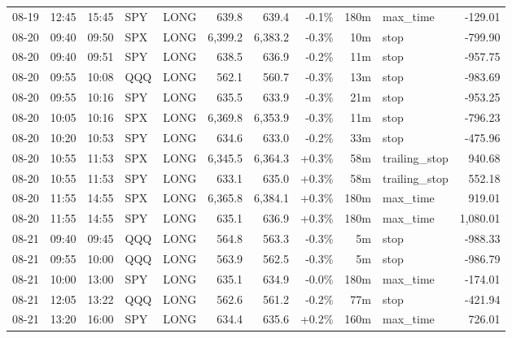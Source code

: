 \documentclass[11pt,a4paper,twoside]{article}
\begin{document}
\begin{center}
\begin{longtable}{>{\color{txtmain}}l l l l l r r r r >{\color{txtmain}}l r}
08-19 & 12:45 & 15:45 & SPY & LONG & 639.8 & 639.4 & \textcolor{lossred}{-0.1\%} & 180m & max\_time & \textcolor{lossred}{-129.01} \\
08-20 & 09:40 & 09:50 & SPX & LONG & 6,399.2 & 6,383.2 & \textcolor{lossred}{-0.3\%} & 10m & stop & \textcolor{lossred}{-799.90} \\
08-20 & 09:40 & 09:51 & SPY & LONG & 638.5 & 636.9 & \textcolor{lossred}{-0.2\%} & 11m & stop & \textcolor{lossred}{-957.75} \\
08-20 & 09:55 & 10:08 & QQQ & LONG & 562.1 & 560.7 & \textcolor{lossred}{-0.3\%} & 13m & stop & \textcolor{lossred}{-983.69} \\
08-20 & 09:55 & 10:16 & SPY & LONG & 635.5 & 633.9 & \textcolor{lossred}{-0.3\%} & 21m & stop & \textcolor{lossred}{-953.25} \\
08-20 & 10:05 & 10:16 & SPX & LONG & 6,369.8 & 6,353.9 & \textcolor{lossred}{-0.3\%} & 11m & stop & \textcolor{lossred}{-796.23} \\
08-20 & 10:20 & 10:53 & SPY & LONG & 634.6 & 633.0 & \textcolor{lossred}{-0.2\%} & 33m & stop & \textcolor{lossred}{-475.96} \\
08-20 & 10:55 & 11:53 & SPX & LONG & 6,345.5 & 6,364.3 & \textcolor{wingreen}{+0.3\%} & 58m & trailing\_stop & \textcolor{wingreen}{940.68} \\
08-20 & 10:55 & 11:53 & SPY & LONG & 633.1 & 635.0 & \textcolor{wingreen}{+0.3\%} & 58m & trailing\_stop & \textcolor{wingreen}{552.18} \\
08-20 & 11:55 & 14:55 & SPX & LONG & 6,365.8 & 6,384.1 & \textcolor{wingreen}{+0.3\%} & 180m & max\_time & \textcolor{wingreen}{919.01} \\
08-20 & 11:55 & 14:55 & SPY & LONG & 635.1 & 636.9 & \textcolor{wingreen}{+0.3\%} & 180m & max\_time & \textcolor{wingreen}{1,080.01} \\
08-21 & 09:40 & 09:45 & QQQ & LONG & 564.8 & 563.3 & \textcolor{lossred}{-0.3\%} & 5m & stop & \textcolor{lossred}{-988.33} \\
08-21 & 09:55 & 10:00 & QQQ & LONG & 563.9 & 562.5 & \textcolor{lossred}{-0.3\%} & 5m & stop & \textcolor{lossred}{-986.79} \\
08-21 & 10:00 & 13:00 & SPY & LONG & 635.1 & 634.9 & \textcolor{lossred}{-0.0\%} & 180m & max\_time & \textcolor{lossred}{-174.01} \\
08-21 & 12:05 & 13:22 & QQQ & LONG & 562.6 & 561.2 & \textcolor{lossred}{-0.2\%} & 77m & stop & \textcolor{lossred}{-421.94} \\
08-21 & 13:20 & 16:00 & SPY & LONG & 634.4 & 635.6 & \textcolor{wingreen}{+0.2\%} & 160m & max\_time & \textcolor{wingreen}{726.01} \\

\end{longtable}
\end{center}
\end{document}
